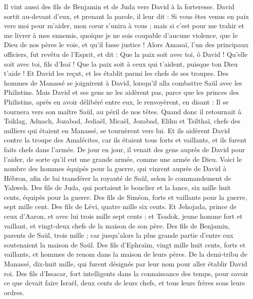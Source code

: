\begin{multicols}{2}
Il vint aussi des fils de Benjamin et de Juda vers David à la forteresse.
David sortit au-devant d'eux, et prenant la parole, il leur dit : Si vous êtes venus en paix vers moi pour m'aider, mon cœur s’unira à vous ; mais si c'est pour me trahir et me livrer à mes ennemis, quoique je ne sois coupable d'aucune violence, que le Dieu de nos pères le voie, et qu'il fasse justice !
Alors Amasaï, l’un des principaux officiers, fut revêtu de l’Esprit, et dit : Que la paix soit avec toi, ô David ! Qu'elle soit avec toi, fils d'Isaï ! Que la paix soit à ceux qui t'aident, puisque ton Dieu t'aide ! Et David les reçut, et les établit parmi les chefs de ses troupes.
Des hommes de Manassé se joignirent à David, lorsqu’il alla combattre Saül avec les Philistins. Mais David et ses gens ne les aidèrent pas, parce que les princes des Philistins, après en avoir délibéré entre eux, le renvoyèrent, en disant : Il se tournera vers son maître Saül, au péril de nos têtes.
Quand donc il retournait à Tsiklag, Adnach, Jozabad, Jediaël, Micaël, Jozabad, Elihu et Tsilthaï, chefs des milliers qui étaient en Manassé, se tournèrent vers lui.
Et ils aidèrent David contre la troupe des Amalécites, car ils étaient tous forts et vaillants, et ils furent faits chefs dans l'armée.
De jour en jour, il venait des gens auprès de David pour l'aider, de sorte qu'il eut une grande armée, comme une armée de Dieu.
Voici le nombre des hommes équipés pour la guerre, qui vinrent auprès de David à Hébron, afin de lui transférer la royauté de Saül, selon le commandement de Yahweh.
Des fils de Juda, qui portaient le bouclier et la lance, six mille huit cents, équipés pour la guerre.
Des fils de Siméon, forts et vaillants pour la guerre, sept mille cent.
Des fils de Lévi, quatre mille six cents.
Et Jehojada, prince de ceux d'Aaron, et avec lui trois mille sept cents ;
et Tsadok, jeune homme fort et vaillant, et vingt-deux chefs de la maison de son père.
Des fils de Benjamin, parents de Saül, trois mille ; car jusqu'alors la plus grande partie d’entre eux soutenaient la maison de Saül.
Des fils d'Ephraïm, vingt mille huit cents, forts et vaillants, et hommes de renom dans la maison de leurs pères.
De la demi-tribu de Manassé, dix-huit mille, qui furent désignés par leur nom pour aller établir David roi.
Des fils d'Issacar, fort intelligents dans la connaissance des temps, pour savoir ce que devait faire Israël, deux cents de leurs chefs, et tous leurs frères sous leurs ordres.

\end{multicols}
